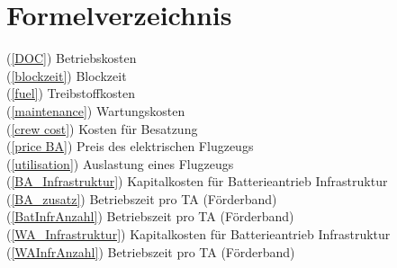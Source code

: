 \chapter{Formelverzeichnis}
\label{ch:Formelverzeichnis}
(\ref{DOC}) Betriebskosten \\
(\ref{blockzeit}) Blockzeit \\
(\ref{fuel}) Treibstoffkosten \\
(\ref{maintenance}) Wartungskosten \\
(\ref{crew cost}) Kosten für Besatzung \\
(\ref{price BA}) Preis des elektrischen Flugzeugs \\
(\ref{utilisation}) Auslastung eines Flugzeugs \\
(\ref{BA_Infrastruktur}) Kapitalkosten für Batterieantrieb Infrastruktur \\
(\ref{BA_zusatz}) Betriebszeit pro TA (Förderband) \\
(\ref{BatInfrAnzahl}) Betriebszeit pro TA (Förderband) \\
(\ref{WA_Infrastruktur}) Kapitalkosten für Batterieantrieb Infrastruktur \\
(\ref{WAInfrAnzahl}) Betriebszeit pro TA (Förderband) \\